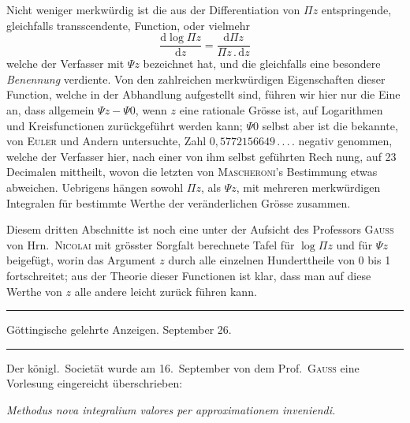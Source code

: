 Nicht weniger merkwürdig ist die aus der Differentiation von $\Pi z$ entspringende, gleichfalls transscendente, Function, oder vielmehr
\[
\frac{\mathrm{d}\log\Pi z}{\mathrm{d}z}=\frac{\mathrm{d}\Pi z}{\Pi z\,.\,\mathrm{d}z}
\]
welche der Verfasser mit $\Psi z$ bezeichnet hat, und die gleichfalls eine besondere \textit{Benennung} verdiente. Von den zahlreichen merkwürdigen Eigenschaften dieser Function, welche in der Abhandlung aufgestellt sind, führen wir hier nur die Eine an, dass allgemein $\Psi z-\Psi 0$, wenn $z$ eine rationale Grösse ist, auf Logarithmen und Kreisfunctionen zurückgeführt werden kann; $\Psi 0$ selbst aber ist die bekannte, von \textsc{Euler} und Andern untersuchte, Zahl $0{,}5772156649\,.\,.\,.\,.$ negativ genommen, welche der Verfasser hier, nach einer von ihm selbst geführten Rech%
nung, auf 23 Decimalen mittheilt, wovon die letzten von \textsc{Mascheroni}'s Bestimmung etwas abweichen. Uebrigens hängen sowohl $\Pi z$, als $\Psi z$, mit mehreren merkwürdigen Integralen für bestimmte Werthe der veränderlichen Grösse zusammen.

Diesem dritten Abschnitte ist noch eine unter der Aufsicht des Professors \textsc{Gauss} von Hrn.\ \textsc{Nicolai} mit grösster Sorgfalt berechnete Tafel für $\log\Pi z$ und für $\Psi z$ beigefügt, worin das Argument $z$ durch alle einzelnen Hunderttheile von 0 bis 1 fortschreitet; aus der Theorie dieser Functionen ist klar, dass man auf diese Werthe von $z$ alle andere leicht zurück führen kann.

\par{}\begin{center}
\rule{0.6\linewidth}{0.4pt}\par\medskip
Göttingische gelehrte Anzeigen. September 26.\par\medskip
\rule{0.6\linewidth}{0.4pt}
\end{center}

Der königl.\ Societät wurde am 16.\ September von dem Prof.\ \textsc{Gauss} eine Vorlesung eingereicht überschrieben:

\begin{center}
\textit{Methodus nova integralium valores per approximationem inveniendi.}
\end{center}

